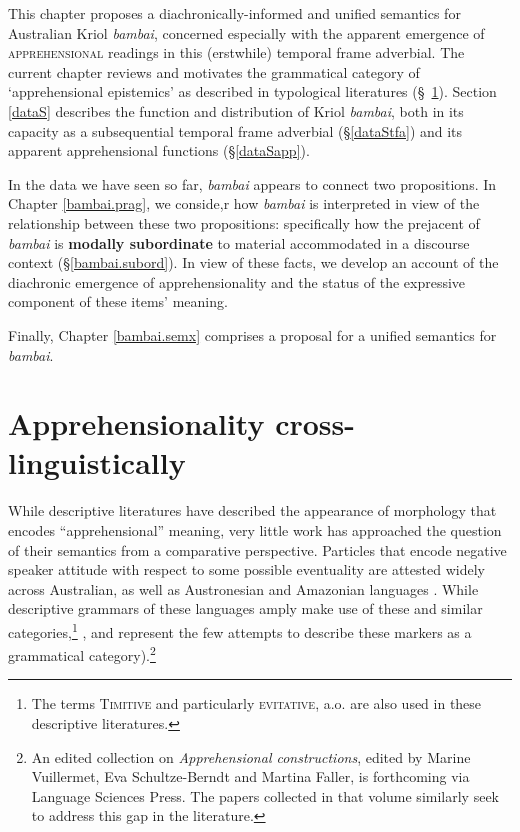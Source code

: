 This chapter proposes a diachronically-informed and unified semantics for Australian Kriol \textit{bambai}, concerned especially with the apparent emergence of \textsc{apprehensional} readings in this (erstwhile) temporal frame adverbial. 
The current chapter reviews and motivates the grammatical category of `apprehensional epistemics' as described in typological literatures (\S~\ref{typS}). Section \ref{dataS} describes the function and distribution of Kriol \textit{bambai}, both in its capacity as a subsequential temporal frame adverbial (§\ref{dataStfa}) and its apparent apprehensional functions (§\ref{dataSapp}). 

In the data we have seen so far, \textit{bambai} appears to connect two propositions. In Chapter \ref{bambai.prag}, we conside,r how \textit{bambai} is interpreted in view of the relationship between these two propositions: specifically how the prejacent of \textit{bambai} is \textbf{modally subordinate} to material accommodated in a discourse context (\S\ref{bambai.subord}). In view of these facts, we develop an account of the diachronic emergence of apprehensionality and the status of the expressive component of these items' meaning.

Finally, Chapter \ref{bambai.semx} comprises a proposal for a unified semantics for \textit{bambai}.%





\section{Apprehensionality cross-linguistically}\label{typS}
While descriptive literatures have described the appearance of morphology that encodes ``apprehensional'' meaning, very little work has approached the question of their semantics from a comparative perspective. Particles that encode negative speaker attitude with respect to some possible eventuality are attested widely across Australian, as well as Austronesian and Amazonian languages \citep[258]{Angelo2016}. While descriptive grammars of these languages amply make use of these and similar categories,\footnote{The terms \textsc{Timitive} and particularly \textsc{evitative}, a.o. are also used in these descriptive literatures.} \citet{Lichtenberk1995}, \citet{Angelo2016,Angelo2018} and \cite{Vuillermet2018} represent the few attempts to describe these markers as a grammatical category).\footnote{An edited collection on  \textit{Apprehensional constructions}, edited by Marine Vuillermet, Eva Schultze-Berndt and Martina Faller, is forthcoming via Language Sciences Press. The papers collected in that volume similarly seek to address this gap in the literature.}

